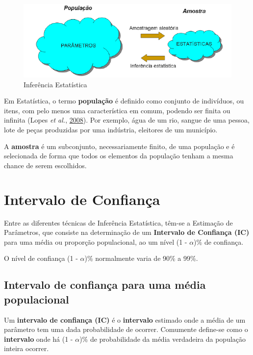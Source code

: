 \documentclass[12pt,brazil,oneside]{book}
\begin{document}
\begin{figure}[H]

{\centering \includegraphics[width=0.7\linewidth]{infestat} 

}

\caption{Inferência Estatística}\label{fig:infestat}
\end{figure}

Em Estatística, o termo \textbf{população} é definido como conjunto de indivíduos, ou itens, com pelo menos uma característica em comum, podendo ser finita ou infinita (Lopes \emph{et al.}, \protect\hyperlink{ref-lopes2008}{2008}). Por exemplo, água de um rio, sangue de uma pessoa, lote de peças produzidas por uma indústria, eleitores de um município.

A \textbf{amostra} é um subconjunto, necessariamente finito, de uma população e é selecionada de forma que todos os elementos da população tenham a mesma chance de serem escolhidos.

\hypertarget{intervalo-de-confianca}{%
\section{Intervalo de Confiança}\label{intervalo-de-confianca}}

Entre as diferentes técnicas de Inferência Estatística, têm-se a Estimação de Parâmetros, que consiste na determinação de um \textbf{Intervalo de Confiança (IC)} para uma média ou proporção populacional, ao um nível (1 - \(\alpha\))\% de confiança.

O nível de confiança (1 - \(\alpha\))\% normalmente varia de 90\% a 99\%.

\hypertarget{intervalo-de-confianca-para-uma-media-populacional}{%
\subsection{Intervalo de confiança para uma média populacional}\label{intervalo-de-confianca-para-uma-media-populacional}}

Um \textbf{intervalo de confiança (IC)} é o \textbf{intervalo} estimado onde a média de um parâmetro tem uma dada probabilidade de ocorrer. Comumente define-se como o \textbf{intervalo} onde há (1 - \(\alpha\))\% de probabilidade da média verdadeira da população inteira ocorrer.
\end{document}
